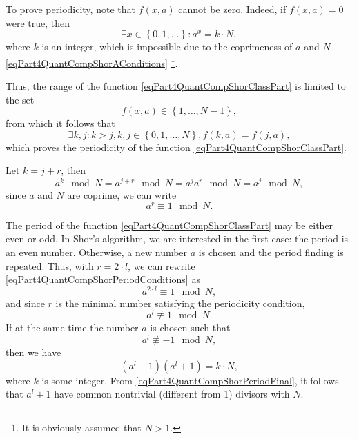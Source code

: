To prove periodicity, note that $f\left(x, a\right)$ cannot
be zero. Indeed, if 
$f\left(x, a\right) = 0$ were true, then
\[
\exists x \in \left\{0, 1, \dots\right\}:
a^x = k \cdot N,
\]
where $k$ is an integer, which is impossible due to
the coprimeness of $a$ and $N$ \eqref{eqPart4QuantCompShorAConditions}
\footnote{It is obviously assumed that $N > 1$.}.

Thus, the range of the function
\eqref{eqPart4QuantCompShorClassPart} is limited to the set 
\begin{equation}
f\left(x,
a\right) \in \left\{1, \dots, N - 1\right\},
\nonumber
\end{equation}
from which it follows that
\begin{equation}
\exists k,j: k > j, k,j \in \left\{0, 1, \dots, N\right\},
f\left(k,a\right) = f\left(j,a\right),
\nonumber
\end{equation}
which proves the periodicity of the function \eqref{eqPart4QuantCompShorClassPart}.

Let $k = j + r$, then
\[
a^k \mod{N} = a^{j + r} \mod{N} = a^j a^r \mod{N}= a^j \mod{N},
\]
since $a$ and $N$ are coprime, we can write
\begin{equation}
a^r \equiv 1 \mod{N}.
\label{eqPart4QuantCompShorPeriodConditions}
\end{equation}


The period of the function \eqref{eqPart4QuantCompShorClassPart} may be
either even or odd. In Shor's algorithm, we are interested in the first case:
the period is an even number. Otherwise, a new number $a$ is chosen and
the period finding is repeated. Thus, with $r= 2\cdot l$, we can rewrite
\eqref{eqPart4QuantCompShorPeriodConditions} as
\begin{equation}
a^{2 \cdot l} \equiv 1 \mod{N},
\nonumber
\end{equation}
and since $r$ is the minimal number satisfying the periodicity condition,
\[
a^{l} \not\equiv 1 \mod{N}.
\]
If at the same time the number $a$ is chosen such that
\[
a^{l} \not\equiv -1 \mod{N},
\]
then we have
\begin{equation}
\left(a^l - 1\right)\left(a^l + 1\right) = k \cdot N,
\label{eqPart4QuantCompShorPeriodFinal}
\end{equation}
where $k$ is some integer. From
\eqref{eqPart4QuantCompShorPeriodFinal}, it follows that $a^l \pm 1$ have
common nontrivial (different from 1) divisors with $N$.

